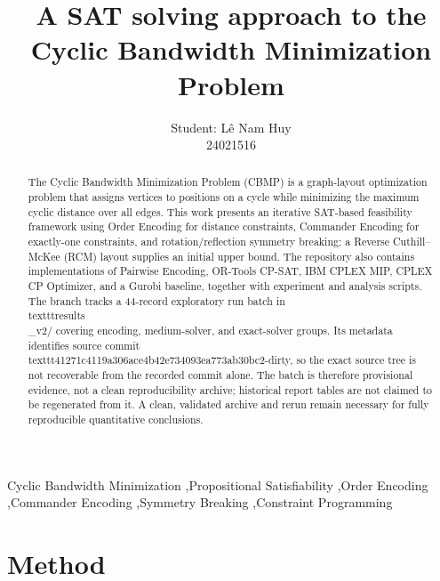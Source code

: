 \documentclass[a4paper,fleqn]{cas-sc}
\begin{document}
\let\WriteBookmarks\relax
\def\floatpagepagefraction{1}
\def\textpagefraction{.001}

\title [mode = title]{A SAT solving approach to the Cyclic Bandwidth Minimization Problem}  
\author{Student: Lê Nam Huy\\24021516}
\begin{abstract}
The Cyclic Bandwidth Minimization Problem (CBMP) is a graph-layout optimization problem that assigns vertices to positions on a cycle while minimizing the maximum cyclic distance over all edges. This work presents an iterative SAT-based feasibility framework using Order Encoding for distance constraints, Commander Encoding for exactly-one constraints, and rotation/reflection symmetry breaking; a Reverse Cuthill--McKee (RCM) layout supplies an initial upper bound. The repository also contains implementations of Pairwise Encoding, OR-Tools CP-SAT, IBM CPLEX MIP, CPLEX CP Optimizer, and a Gurobi baseline, together with experiment and analysis scripts. The branch tracks a 44-record exploratory run batch in \\texttt{results\\_v2/} covering encoding, medium-solver, and exact-solver groups. Its metadata identifies source commit \\texttt{41271c4119a306ace4b42e734093ea773ab30bc2-dirty}, so the exact source tree is not recoverable from the recorded commit alone. The batch is therefore provisional evidence, not a clean reproducibility archive; historical report tables are not claimed to be regenerated from it. A clean, validated archive and rerun remain necessary for fully reproducible quantitative conclusions.
\end{abstract}

\begin{keywords}
Cyclic Bandwidth Minimization \sep Propositional Satisfiability \sep Order Encoding \sep Commander Encoding \sep Symmetry Breaking \sep Constraint Programming
\end{keywords}

\maketitle

\section{Method}
\end{document}
